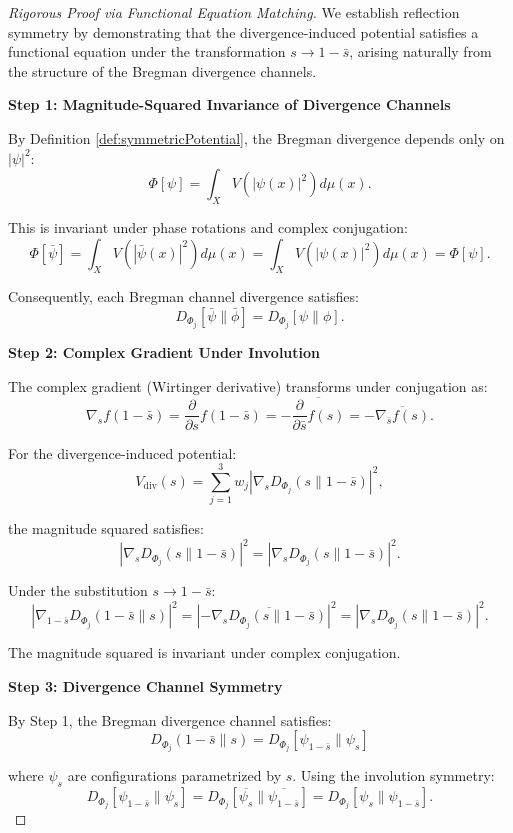 \begin{theorem}
\begin{theorem}
\begin{enumerate}
\end{enumerate}

\begin{proof}[Rigorous Proof via Functional Equation Matching]

We establish reflection symmetry by demonstrating that the divergence-induced potential satisfies a functional equation under the transformation $s \to 1 - \bar{s}$, arising naturally from the structure of the Bregman divergence channels.

\textbf{Step 1: Magnitude-Squared Invariance of Divergence Channels}

By Definition \ref{def:symmetricPotential}, the Bregman divergence depends only on $|\psi|^2$:
\[
\Phi[\psi] = \int_X V(|\psi(x)|^2) d\mu(x).
\]

This is invariant under phase rotations and complex conjugation:
\[
\Phi[\bar{\psi}] = \int_X V(|\bar{\psi}(x)|^2) d\mu(x) = \int_X V(|\psi(x)|^2) d\mu(x) = \Phi[\psi].
\]

Consequently, each Bregman channel divergence satisfies:
\[
D_{\Phi_j}[\bar{\psi} \| \bar{\phi}] = D_{\Phi_j}[\psi \| \phi].
\]

\textbf{Step 2: Complex Gradient Under Involution}

The complex gradient (Wirtinger derivative) transforms under conjugation as:
\[
\nabla_s f(1 - \bar{s}) = \frac{\partial}{\partial s} f(1 - \bar{s}) = -\overline{\frac{\partial}{\partial \bar{s}} f(s)} = -\overline{\nabla_{\bar{s}} f(s)}.
\]

For the divergence-induced potential:
\[
V_{\mathrm{div}}(s) = \sum_{j=1}^3 w_j |\nabla_s D_{\Phi_j}(s \| 1-\bar{s})|^2,
\]

the magnitude squared satisfies:
\[
|\nabla_s D_{\Phi_j}(s \| 1-\bar{s})|^2 = \left|\nabla_s D_{\Phi_j}(s \| 1-\bar{s})\right|^2.
\]

Under the substitution $s \to 1 - \bar{s}$:
\[
|\nabla_{1-\bar{s}} D_{\Phi_j}(1-\bar{s} \| s)|^2 = \left|-\overline{\nabla_s D_{\Phi_j}(s \| 1-\bar{s})}\right|^2 = |\nabla_s D_{\Phi_j}(s \| 1-\bar{s})|^2.
\]

The magnitude squared is invariant under complex conjugation.

\textbf{Step 3: Divergence Channel Symmetry}

By Step 1, the Bregman divergence channel satisfies:
\[
D_{\Phi_j}(1-\bar{s} \| s) = D_{\Phi_j}[\psi_{1-\bar{s}} \| \psi_s]
\]

where $\psi_s$ are configurations parametrized by $s$. Using the involution symmetry:
\[
D_{\Phi_j}[\psi_{1-\bar{s}} \| \psi_s] = D_{\Phi_j}[\overline{\psi_s} \| \overline{\psi_{1-\bar{s}}}] = D_{\Phi_j}[\psi_s \| \psi_{1-\bar{s}}].
\]


\end{proof}
\end{theorem}
\end{theorem}
